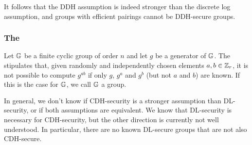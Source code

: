 It follows that the DDH assumption is indeed stronger than the discrete log assumption, and groups with efficient pairings cannot be DDH-secure groups. %

\subsubsection{The }
%
\begin{definition}
Let $\mathbb{G}$ be a finite cyclic group of order $n$ and let $g$ be a generator of $\mathbb{G}$. The  stipulates that, given randomly and independently  chosen elements $a,b\in\mathbb{Z}_r$, it is not possible to compute $g^{ab}$ if only $g$, $g^a$ and $g^b$ (but not $a$ and $b$) are known. If this is the case for $\mathbb{G}$, we call $\mathbb{G}$ a  group.
\end{definition}

In general, we don't know if CDH-security is a stronger assumption than DL-security, or if both assumptions are equivalent. We know that DL-security is necessary for CDH-security, but the other direction is currently not well understood. In particular, there are no known DL-secure groups  that are not also CDH-secure. %

